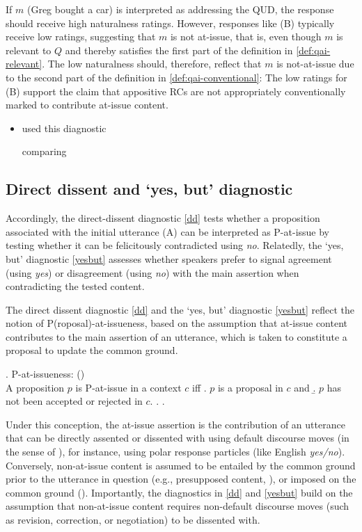 \documentclass[times,linguex,xcolor]{glossa}
\begin{document}
      If $m$ (Greg bought a car) is interpreted as addressing the QUD, the response should receive high naturalness ratings. However, responses like (B) typically receive low ratings, suggesting that $m$ is not at-issue, that is, even though $m$ is relevant to $Q$ and thereby satisfies the first part of the definition in \ref{def:qai-relevant}. The low naturalness should, therefore, reflect that $m$ is not-at-issue due to the second part of the definition in \ref{def:qai-conventional}: The low ratings for (B) support the claim that appositive RCs are not appropriately conventionally marked to contribute at-issue content.

      \begin{itemize}
        \item \citealt{chen_presuppositions_2024} used this diagnostic 

        comparing  

      \end{itemize}

  \subsection{Direct dissent and `yes, but' diagnostic}
    Accordingly, the direct-dissent diagnostic \ref{dd} tests whether a proposition associated with the initial utterance (A) can be interpreted as P-at-issue by testing whether it can be felicitously contradicted using \emph{no}. Relatedly, the `yes, but' diagnostic \ref{yesbut} assesses whether speakers prefer to signal agreement (using \emph{yes}) or disagreement (using \emph{no}) with the main assertion when contradicting the tested content.

    The direct dissent diagnostic \ref{dd} and the `yes, but' diagnostic \ref{yesbut} reflect the notion of P(roposal)-at-issueness, based on the assumption that at-issue content contributes to the main assertion of an utterance, which is taken to constitute a proposal to update the common ground.

     \ex. P-at-issueness: \hfill (\citealt{koev_apposition_2013,koev_notions_2018})\\
      A proposition $p$ is P-at-issue in a context $c$ iff
      \a. $p$ is a proposal in $c$ and
      \b. $p$ has not been accepted or rejected in $c$.
      \z.
    \z.

    Under this conception, the at-issue assertion is the contribution of an utterance that can be directly assented or dissented with using default discourse moves (in the sense of \citealt{farkas_reacting_2010}), for instance, using polar response particles (like English \emph{yes/no}). Conversely, non-at-issue content is assumed to be entailed by the common ground prior to the utterance in question (e.g., presupposed content, \citealt{stalnaker_presuppositions_1973,stalnaker_common_2002}), or imposed on the common ground (\citealt{murray_varieties_2014,anderbois_at-issue_2015}). Importantly, the diagnostics in \ref{dd} and \ref{yesbut} build on the assumption that non-at-issue content requires non-default discourse moves (such as revision, correction, or negotiation) to be dissented with.
\end{document}
